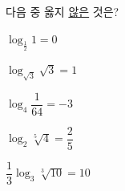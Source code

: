 다음 중 옳지 \underline{않은} 것은?
\begin{choicesii}{\rule[-3ex]{0pt}{8ex}$\log_{\frac{1}{2}} 1=0$}{\rule[-3ex]{0pt}{8ex}$\log_{\sqrt{3}}\sqrt{3}=1$}{\rule[-3ex]{0pt}{8ex}$\log_4 \dfrac{1}{64}=-3$}{\rule[-3ex]{0pt}{8ex}$\log_2 \sqrt[5]{4}=\dfrac{2}{5}$}{\rule[-3ex]{0pt}{8ex}$\dfrac{1}{3}\log_3 \sqrt[3]{10}=10$}\end{choicesii}
